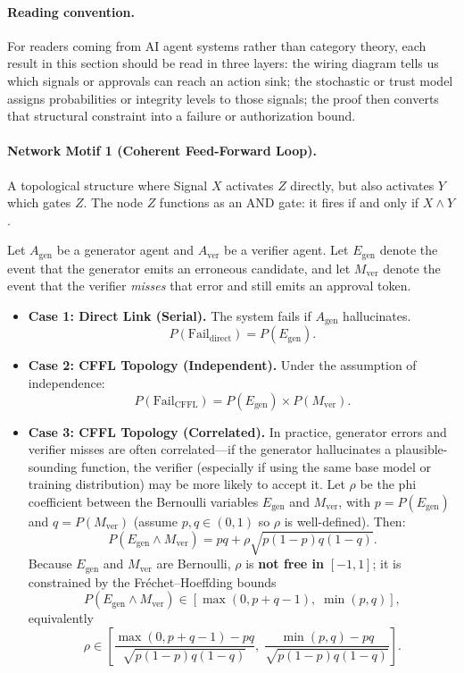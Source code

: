 \paragraph{Reading convention.}
For readers coming from AI agent systems rather than category theory, each result in this section should be read in three layers: the wiring diagram tells us which signals or approvals can reach an action sink; the stochastic or trust model assigns probabilities or integrity levels to those signals; the proof then converts that structural constraint into a failure or authorization bound.

\paragraph{Network Motif 1 (Coherent Feed-Forward Loop).}
A topological structure where Signal $X$ activates $Z$ directly, but also activates $Y$ which gates $Z$. The node
$Z$ functions as an AND gate: it fires if and only if $X \wedge Y$.

\begin{theorem}\label{thm:cffl-error-suppression}
Let $A_{\mathrm{gen}}$ be a generator agent and $A_{\mathrm{ver}}$ be a verifier agent. Let
$E_{\mathrm{gen}}$ denote the event that the generator emits an erroneous candidate, and let
$M_{\mathrm{ver}}$ denote the event that the verifier \emph{misses} that error and still emits an approval token.
\begin{itemize}[leftmargin=*]
\item \textbf{Case 1: Direct Link (Serial).} The system fails if $A_{\mathrm{gen}}$ hallucinates.
\[
P(\mathrm{Fail}_{\mathrm{direct}}) = P(E_{\mathrm{gen}}).
\]
\item \textbf{Case 2: CFFL Topology (Independent).} Under the assumption of independence:
\[
P(\mathrm{Fail}_{\mathrm{CFFL}}) = P(E_{\mathrm{gen}})\times P(M_{\mathrm{ver}}).
\]
\item \textbf{Case 3: CFFL Topology (Correlated).} In practice, generator errors and verifier misses are often correlated---if the generator hallucinates a plausible-sounding function, the verifier (especially if using the same base model or training distribution) may be more likely to accept it. Let $\rho$ be the phi coefficient between the Bernoulli variables $E_{\mathrm{gen}}$ and $M_{\mathrm{ver}}$, with $p = P(E_{\mathrm{gen}})$ and $q = P(M_{\mathrm{ver}})$ (assume $p,q\in(0,1)$ so $\rho$ is well-defined). Then:
\[
P(E_{\mathrm{gen}} \wedge M_{\mathrm{ver}}) = pq + \rho\sqrt{p(1-p)q(1-q)}.
\]
Because $E_{\mathrm{gen}}$ and $M_{\mathrm{ver}}$ are Bernoulli, $\rho$ is \textbf{not free in} $[-1,1]$; it is constrained by the Fr\'echet--Hoeffding bounds
\[
P(E_{\mathrm{gen}} \wedge M_{\mathrm{ver}}) \in [\max(0,p+q-1),\;\min(p,q)],
\]
equivalently
\[
\rho \in \left[\frac{\max(0,p+q-1)-pq}{\sqrt{p(1-p)q(1-q)}},\;\frac{\min(p,q)-pq}{\sqrt{p(1-p)q(1-q)}}\right].
\]
\end{itemize}
\end{theorem}

